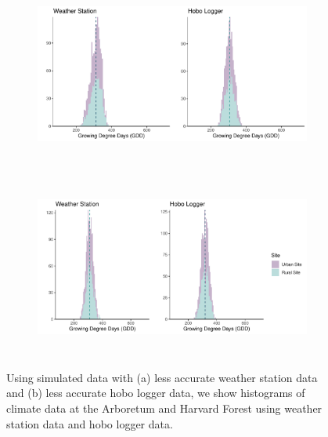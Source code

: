 \documentclass{article}\usepackage[]{graphicx}\usepackage[]{color}
\begin{document}
\begin{figure}[H]
  \begin{subfigure}{.5\textwidth}
    \caption{}
    \centering
    \includegraphics[height=6cm, width=10cm]{..//analyses/figures/gdd_methods_noisyws.pdf}
    \label{fig:gddnoisyws}
    \end{subfigure}
  \begin{subfigure}{.5\textwidth}
      \caption{}
      \centering
      \includegraphics[height=6cm, width=10cm]{..//analyses/figures/gdd_methods_noisyhobo.pdf}
    \label{fig:gddnoisyhobo}
    \end{subfigure}
\caption{ Using simulated data with (a) less accurate weather station data and (b) less accurate hobo logger data, we show histograms of climate data at the Arboretum and Harvard Forest using weather station data and hobo logger data.}
\label{fig:climhists}
\end{figure}
\end{document}
